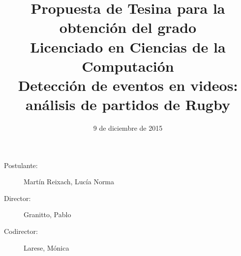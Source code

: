 \documentclass[11pt]{article}
\begin{document}
\date{9 de diciembre de 2015}
\title{Propuesta de Tesina para la obtención del grado \\ Licenciado en Ciencias de la Computación
\\ Detección de eventos en videos: análisis de partidos de Rugby}
\maketitle

\begin{description}
  \item[Postulante:] Martín Reixach, Lucía Norma
  \item[Director:] Granitto, Pablo
  \item[Codirector:] Larese, Mónica
\end{description}











\printbibliography

%
\end{document}
